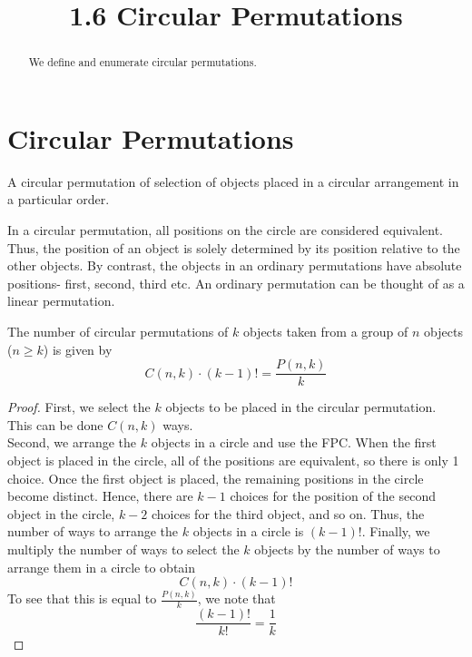 \documentclass[handout]{ximera}
\title{1.6 Circular Permutations}
\begin{document}
\begin{abstract}
We define and enumerate circular permutations.
\end{abstract}

\maketitle

\section{Circular Permutations}



\begin{definition}
A circular permutation of selection of objects placed in a circular 
arrangement in a particular order.
\end{definition}


In a circular permutation, all positions on the circle are considered equivalent. 
Thus, the position of an object
is solely determined by its position relative to the other objects. 
By contrast, the objects in an ordinary permutations have 
absolute positions- first, second, third etc.  An ordinary permutation 
can be thought of as a linear permutation.\\

\begin{proposition}
The number of circular permutations of $k$ objects taken from a 
group of $n$ objects ($n \geq k$) is given by
\[
C(n,k)\cdot (k-1)! = \frac{P(n,k)}{k}
\]
\end{proposition}

\begin{proof}
First, we select the $k$ objects to be placed in the circular permutation.  
This can be done $C(n,k)$ ways.\\
Second, we arrange the $k$ objects in a circle and use the FPC. 
When the first object is placed in the circle, all of the positions are 
equivalent, so there is only 1 choice. Once the first object is placed, 
the remaining positions in the circle become distinct.  
Hence, there are $k-1$ choices for the position of the second object in the 
circle, $k-2$ choices for the third object, and so on. 
Thus, the number of ways to arrange the $k$ objects in a circle  is $(k-1)!$.
Finally, we multiply the number of ways to select the $k$ objects by the 
number of ways to arrange them in a circle to obtain
\[
C(n,k)\cdot (k-1)!
\]
To see that this is equal to $\frac{P(n,k)}{k}$, we note that 
\[
\frac{(k-1)!}{k!} = \frac{1}{k}
\]
\end{proof}
\end{document}

